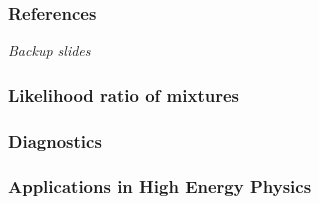 \documentclass{beamer}
\begin{document}
\begin{frame}
    \frametitle{References}
    {\footnotesize
    
    }
\end{frame}

\begin{frame}
    \vfill
    \centering
    \it Backup slides
    \vfill
\end{frame}


\begin{frame}
    \frametitle{Likelihood ratio of mixtures}
\end{frame}

\begin{frame}
    \frametitle{Diagnostics}
\end{frame}

\begin{frame}
    \frametitle{Applications in High Energy Physics}
\end{frame}
\end{document}
